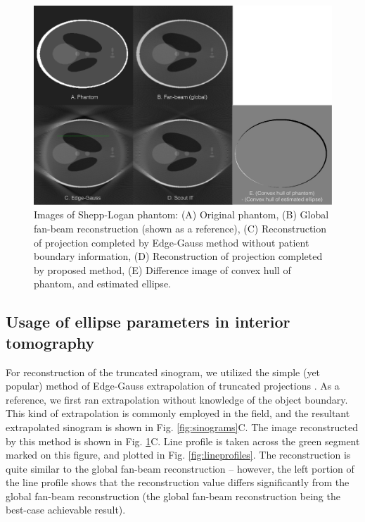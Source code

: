 \documentclass[]{spie}
\begin{document}
\begin{figure}[hbtp]
\centering
\includegraphics[width=15 cm]{fig-recons}
\caption{Images of Shepp-Logan phantom: (A) Original phantom, (B) Global fan-beam reconstruction (shown as a reference), (C) Reconstruction of projection completed by Edge-Gauss method without patient boundary information, (D) Reconstruction of projection completed by proposed method, (E) Difference image of convex hull of phantom, and estimated ellipse. \label{fig:recon-images}}
\end{figure}

\subsection{Usage of ellipse parameters in interior tomography}

For reconstruction of the truncated sinogram, we utilized the simple (yet popular) method of Edge-Gauss extrapolation of truncated projections \cite{Hoppe2008}. As a reference, we first ran extrapolation without knowledge of the object boundary. This kind of extrapolation is commonly employed in the field, and the resultant extrapolated sinogram is shown in Fig. \ref{fig:sinograms}C. The image reconstructed by this method is shown in Fig. \ref{fig:recon-images}C. Line profile is taken across the green segment marked on this figure, and plotted in Fig. \ref{fig:lineprofiles}. The reconstruction is quite similar to the global fan-beam reconstruction -- however, the left portion of the line profile shows that the reconstruction value differs significantly from the global fan-beam reconstruction (the global fan-beam reconstruction being the best-case achievable result). 
\end{document}
